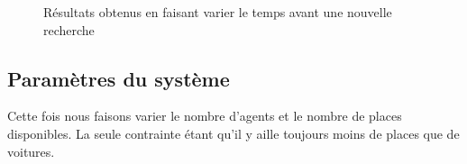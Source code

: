 \begin{figure}
\begin{center}
  \end{center}

  \caption{Résultats obtenus en faisant varier le temps avant une nouvelle recherche}
  \label{timeb4search:all}
\end{figure}

\subsection{Paramètres du système}

Cette fois nous faisons varier le nombre d'agents et le nombre de places disponibles. La seule contrainte étant qu'il y aille toujours moins de places que de voitures.

